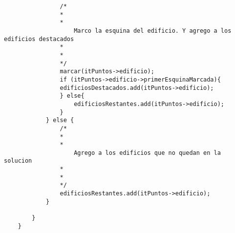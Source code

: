 \begin{lstlisting}
				/*
 				*
 				*
 					Marco la esquina del edificio. Y agrego a los edificios destacados
 				*
 				*
 				*/
				marcar(itPuntos->edificio);
				if (itPuntos->edificio->primerEsquinaMarcada){
				edificiosDestacados.add(itPuntos->edificio);
				} else{
					edificiosRestantes.add(itPuntos->edificio);
				}
			} else {
				/*
 				*
 				*
 					Agrego a los edificios que no quedan en la solucion
 				*
 				*
 				*/
				edificiosRestantes.add(itPuntos->edificio);
			}

		}
	}
\end{lstlisting}
